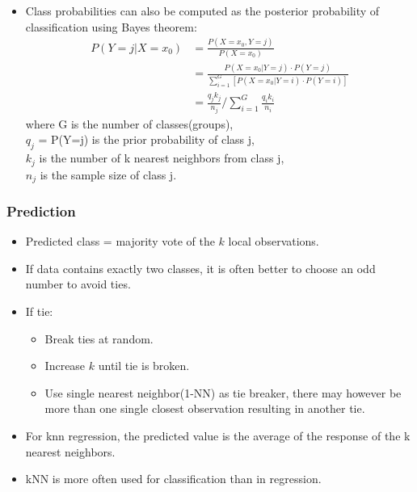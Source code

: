 \documentclass[12pt, oneside]{article}
\begin{document}
\begin{itemize}
    \item Class probabilities can also be computed as the posterior probability of classification using Bayes theorem:
    \begin{align*}
        P(Y=j|X=x_0) &= \frac{P(X=x_0,Y=j)}{P(X=x_0)} \\
        &= \frac{P(X=x_0|Y=j) \cdot P(Y=j)}{\sum^G_{i=1} [P(X=x_0|Y=i) \cdot P(Y=i)]}\\
        &= \frac{q_j k_j}{n_j} / \sum^G_{i=1}\frac{q_i k_i}{n_i}
    \end{align*}
    where G is the number of classes(groups), \\
    $q_j$ = P(Y=j) is the prior probability of class j, \\
    $k_j$ is the number of k nearest neighbors from class j, \\
    $n_j$ is the sample size of class j. 
\end{itemize}

\subsubsection{Prediction}
\begin{itemize}
    \item Predicted class = majority vote of the $k$ local observations. 
    \item If data contains exactly two classes, it is often better to choose an odd number to avoid ties. 
    \item If tie:
    \begin{itemize}
        \item Break ties at random.
        \item Increase $k$ until tie is broken.
        \item Use single nearest neighbor(1-NN) as tie breaker, there may however be more than one single closest observation resulting in another tie. 
    \end{itemize}
    \item For knn regression, the predicted value is the average of the response of the k nearest neighbors. 
    \item kNN is more often used for classification than in regression.
\end{itemize}
\end{document}
